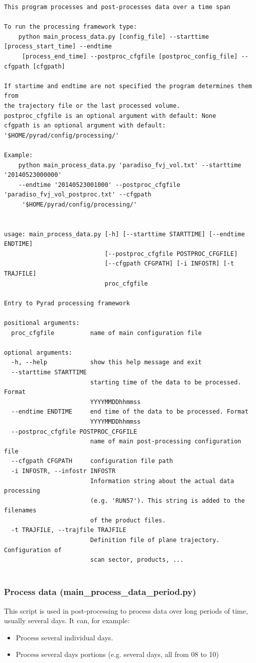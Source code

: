 \documentclass[a4paper,11pt,pdftex,twoside]{scrartcl}
\begin{document}
\begin{verbatim}
This program processes and post-processes data over a time span

To run the processing framework type:
    python main_process_data.py [config_file] --starttime [process_start_time] --endtime
     [process_end_time] --postproc_cfgfile [postproc_config_file] --cfgpath [cfgpath]

If startime and endtime are not specified the program determines them from
the trajectory file or the last processed volume.
postproc_cfgfile is an optional argument with default: None
cfgpath is an optional argument with default: '$HOME/pyrad/config/processing/'

Example:
    python main_process_data.py 'paradiso_fvj_vol.txt' --starttime '20140523000000' 
    --endtime '20140523001000' --postproc_cfgfile 'paradiso_fvj_vol_postproc.txt' --cfgpath
     '$HOME/pyrad/config/processing/'


usage: main_process_data.py [-h] [--starttime STARTTIME] [--endtime ENDTIME]
                            [--postproc_cfgfile POSTPROC_CFGFILE]
                            [--cfgpath CFGPATH] [-i INFOSTR] [-t TRAJFILE]
                            proc_cfgfile

Entry to Pyrad processing framework

positional arguments:
  proc_cfgfile          name of main configuration file

optional arguments:
  -h, --help            show this help message and exit
  --starttime STARTTIME
                        starting time of the data to be processed. Format
                        YYYYMMDDhhmmss
  --endtime ENDTIME     end time of the data to be processed. Format
                        YYYYMMDDhhmmss
  --postproc_cfgfile POSTPROC_CFGFILE
                        name of main post-processing configuration file
  --cfgpath CFGPATH     configuration file path
  -i INFOSTR, --infostr INFOSTR
                        Information string about the actual data processing
                        (e.g. 'RUN57'). This string is added to the filenames
                        of the product files.
  -t TRAJFILE, --trajfile TRAJFILE
                        Definition file of plane trajectory. Configuration of
                        scan sector, products, ...


\end{verbatim}

\subsubsection{Process data (main\_process\_data\_period.py)}
This script is used in post-processing to process data over long periods of time, usually several days.
It can, for example:
\begin{itemize}
   \item Process several individual days.
   \item Process several days portions (e.g. several days, all from 08 to 10)
\end{itemize}
\end{document}

